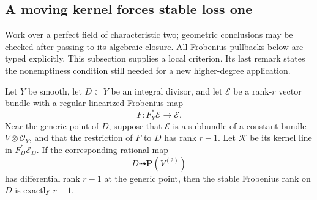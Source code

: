 \subsection{A moving kernel forces stable loss one}
\label{subsec:Cartier-kernel-wall-inertia}

Work over a perfect field of characteristic two; geometric conclusions
may be checked after passing to its algebraic closure.  All Frobenius
pullbacks below are typed explicitly.  This subsection supplies a local
criterion.  Its last remark states the nonemptiness condition still
needed for a new higher-degree application.

\begin{lemma}
\label{lem:maximal-kernel-variation-stable-loss}
Let \(Y\) be smooth, let \(D\subset Y\) be an integral divisor, and
let \(\mathcal E\) be a rank-\(r\) vector bundle with a regular
linearized Frobenius map
\[
             F:F_Y^*\mathcal E\longrightarrow\mathcal E.
                                                        \tag{KWI1}
\]
Near the generic point of \(D\), suppose that \(\mathcal E\) is a
subbundle of a constant bundle \(V\otimes\mathcal O_Y\), and that
the restriction of \(F\) to \(D\) has rank \(r-1\).
Let \(\mathcal K\) be its kernel line in \(F_D^*\mathcal E_D\).
If the corresponding rational map
\[
             D\dashrightarrow\mathbf P(V^{(2)})
                                                        \tag{KWI2}
\]
has differential rank \(r-1\) at the generic point, then the stable
Frobenius rank on \(D\) is exactly \(r-1\).
\end{lemma}
